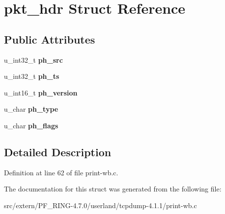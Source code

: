 \hypertarget{structpkt__hdr}{
\section{pkt\_\-hdr Struct Reference}
\label{structpkt__hdr}
}
\subsection*{Public Attributes}
\begin{DoxyCompactItemize}
\item 
\hypertarget{structpkt__hdr_a4a19f49c316c378527f1b16b90868f56}{
u\_\-int32\_\-t {\bfseries ph\_\-src}}
\label{structpkt__hdr_a4a19f49c316c378527f1b16b90868f56}

\item 
\hypertarget{structpkt__hdr_ae14246f80d6704445112e53f44d11831}{
u\_\-int32\_\-t {\bfseries ph\_\-ts}}
\label{structpkt__hdr_ae14246f80d6704445112e53f44d11831}

\item 
\hypertarget{structpkt__hdr_a9aa2a4902573f099868e8a60931fcc2f}{
u\_\-int16\_\-t {\bfseries ph\_\-version}}
\label{structpkt__hdr_a9aa2a4902573f099868e8a60931fcc2f}

\item 
\hypertarget{structpkt__hdr_ad921e45ead23dc453442d9f0d60c6ac0}{
u\_\-char {\bfseries ph\_\-type}}
\label{structpkt__hdr_ad921e45ead23dc453442d9f0d60c6ac0}

\item 
\hypertarget{structpkt__hdr_a0bbd62f167a74a7e5be4400bdf312957}{
u\_\-char {\bfseries ph\_\-flags}}
\label{structpkt__hdr_a0bbd62f167a74a7e5be4400bdf312957}

\end{DoxyCompactItemize}


\subsection{Detailed Description}


Definition at line 62 of file print-\/wb.c.



The documentation for this struct was generated from the following file:\begin{DoxyCompactItemize}
\item 
src/extern/PF\_\-RING-\/4.7.0/userland/tcpdump-\/4.1.1/print-\/wb.c\end{DoxyCompactItemize}
